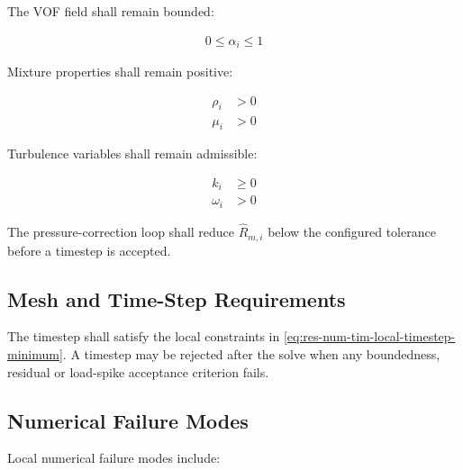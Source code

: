 The VOF field shall remain bounded:

\begin{align}
  0
  \leq
  \alpha_i
  \leq
  1
  \label{eq:res-num-stb-local-alpha-bounds}
\end{align}

Mixture properties shall remain positive:

\begin{align}
  \rho_i
  &>
  0
  \label{eq:res-num-stb-local-density-positive}
  \\
  \mu_i
  &>
  0
  \label{eq:res-num-stb-local-viscosity-positive}
\end{align}

Turbulence variables shall remain admissible:

\begin{align}
  k_i
  &\geq
  0
  \label{eq:res-num-stb-local-k-positive}
  \\
  \omega_i
  &>
  0
  \label{eq:res-num-stb-local-omega-positive}
\end{align}

The pressure-correction loop shall reduce
$\widehat{R}_{m,i}$ below the configured tolerance before a timestep is
accepted.

\subsection{Mesh and Time-Step Requirements}
\label{sec:res-num-stb-mesh-time-step-requirements}


The timestep shall satisfy the local constraints in
\cref{eq:res-num-tim-local-timestep-minimum}. A timestep may be
rejected after the solve when any boundedness, residual or load-spike
acceptance criterion fails.

\subsection{Numerical Failure Modes}
\label{sec:res-num-stb-numerical-failure-modes}


Local numerical failure modes include:

